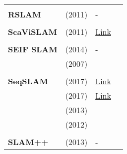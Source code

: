 \documentclass[a4paper,12pt]{scrartcl}
\begin{document}
{\begin{longtable}{l|l|l|l}
                           &                                   &                                                                    &                       \\
    \textbf{RSLAM}         & \cite{Mei2011} (2011)             & -                                                                  &                       \\
                           &                                   &                                                                    &                       \\
    \textbf{ScaViSLAM}     & \cite{Strasdat2011} (2011)        & {\href{https://github.com/strasdat/ScaViSLAM}{Link}}               &                       \\
                           &                                   &                                                                    &                       \\
    \textbf{SEIF SLAM}     & \cite{Torres-Gonzalez2014} (2014) & -                                                                  &                       \\
                           & \cite{Walter2007} (2007)          &                                                                    &                       \\
                           &                                   &                                                                    &                       \\
    \textbf{SeqSLAM}       & \cite{bai2017} (2017)             & {\href{https://github.com/subokita/OpenSeqSLAM}{Link}}             &                       \\
                           & \cite{Siam2017} (2017)            & {\href{https://github.com/siam1251/Fast-SeqSLAM}{Link}}            &                       \\
                           & \cite{Sunderhauf2013} (2013)      &                                                                    &                       \\
                           & \cite{Milford2012} (2012)         &                                                                    &                       \\
                           &                                   &                                                                    &                       \\
    \textbf{SLAM++}        & \cite{Salas-moreno2013} (2013)    & -                                                                  &                       \\

\end{longtable}}
\end{document}

